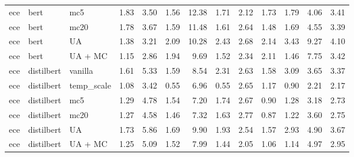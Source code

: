 \begin{tabular}{lllrrrrrrrrrr}
      ece &        bert &         mc5 &   1.83 &   3.50 &     1.56 &   12.38 &   1.71 &   2.12 &   1.73 &   1.79 &   4.06 &   3.41 \\
      ece &        bert &        mc20 &   1.78 &   3.67 &     1.59 &   11.48 &   1.61 &   2.64 &   1.48 &   1.69 &   4.55 &   3.39 \\
      ece &        bert &          UA &   1.38 &   3.21 &     2.09 &   10.28 &   2.43 &   2.68 &   2.14 &   3.43 &   9.27 &   4.10 \\
      ece &        bert &     UA + MC &   1.15 &   2.86 &     1.94 &    9.69 &   1.52 &   2.34 &   2.11 &   1.46 &   7.75 &   3.42 \\
      ece &  distilbert &     vanilla &   1.61 &   5.33 &     1.59 &    8.54 &   2.31 &   2.63 &   1.58 &   3.09 &   3.65 &   3.37 \\
      ece &  distilbert &  temp\_scale &   1.08 &   3.42 &     0.55 &    6.96 &   0.55 &   2.65 &   1.17 &   0.90 &   2.21 &   2.17 \\
      ece &  distilbert &         mc5 &   1.29 &   4.78 &     1.54 &    7.20 &   1.74 &   2.67 &   0.90 &   1.28 &   3.18 &   2.73 \\
      ece &  distilbert &        mc20 &   1.27 &   4.58 &     1.46 &    7.32 &   1.63 &   2.77 &   0.87 &   1.22 &   3.60 &   2.75 \\
      ece &  distilbert &          UA &   1.73 &   5.86 &     1.69 &    9.90 &   1.93 &   2.54 &   1.57 &   2.93 &   4.90 &   3.67 \\
      ece &  distilbert &     UA + MC &   1.25 &   5.09 &     1.52 &    7.99 &   1.44 &   2.05 &   1.06 &   1.14 &   4.97 &   2.95 \\
\bottomrule
\end{tabular}
